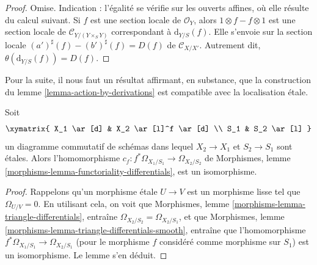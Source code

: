 \begin{proof}
Omise. Indication : l'égalité se vérifie sur les ouverts affines, où elle
résulte du calcul suivant. Si $f$ est une section locale de
$\mathcal{O}_Y$, alors $1 \otimes f - f \otimes 1$ est une section locale
de $\mathcal{C}_{Y/(Y \times_S Y)}$ correspondant à $\text{d}_{Y/S}(f)$.
Elle s'envoie sur la section locale $(a')^\sharp(f) - (b')^\sharp(f) = D(f)$
de $\mathcal{C}_{X/X'}$. Autrement dit, $\theta(\text{d}_{Y/S}(f)) = D(f)$.
\end{proof}

\noindent
Pour la suite, il nous faut un résultat affirmant, en substance, que la
construction du
lemme \ref{lemma-action-by-derivations}
est compatible avec la localisation étale.

\begin{lemma}
\label{lemma-sheaf-differentials-etale-localization}
Soit
$$
\xymatrix{
X_1 \ar[d] & X_2 \ar[l]^f \ar[d] \\
S_1 & S_2 \ar[l]
}
$$
un diagramme commutatif de schémas dans lequel $X_2 \to X_1$ et $S_2 \to S_1$
sont étales. Alors l'homomorphisme $c_f : f^*\Omega_{X_1/S_1} \to \Omega_{X_2/S_2}$ de
Morphismes, lemme \ref{morphisms-lemma-functoriality-differentials},
est un isomorphisme.
\end{lemma}

\begin{proof}
Rappelons qu'un morphisme étale $U \to V$ est un morphisme lisse
tel que $\Omega_{U/V} = 0$. En utilisant cela, on voit que
Morphismes, lemme \ref{morphisms-lemma-triangle-differentials},
entraîne $\Omega_{X_2/S_2} = \Omega_{X_2/S_1}$, et que
Morphismes, lemme \ref{morphisms-lemma-triangle-differentials-smooth},
entraîne que l'homomorphisme $f^*\Omega_{X_1/S_1} \to \Omega_{X_2/S_1}$
(pour le morphisme $f$ considéré comme morphisme sur $S_1$)
est un isomorphisme. Le lemme s'en déduit.
\end{proof}

